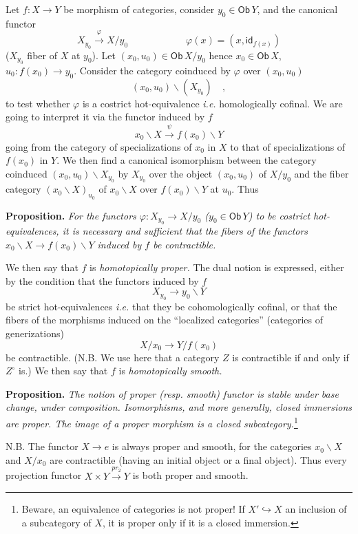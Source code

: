 \documentclass[11pt]{article}
\newcommand{\msp}[1]{\marginpar{\footnotesize [#1]}}
\newcommand{\Ob}{\mathsf{Ob}}
\newcommand{\id}{\mathsf{id}}
\begin{document}
\noindent Let $f : X \to Y$ be morphism of categories, consider $y_0 \in \Ob\, Y$, and the canonical functor
\[
X_{y_0} \xrightarrow{\varphi} X/y_0 \qquad\qquad\qquad \varphi(x) = (x, \id_{f(x)}) \tag*{(1)}
\]
($X_{y_0}$ fiber of $X$ at $y_0$). Let $(x_0, u_0) \in \Ob\, X/y_0$ hence $x_0 \in \Ob\, X$, $u_0 : f(x_0) \to y_0$. Consider the category coinduced by $\varphi$ over $(x_0, u_0)$
\[
(x_0, u_0)\backslash(X_{y_0}) \quad ,
\]
to test whether $\varphi$ is a costrict hot-equivalence \textit{i.e.} homologically cofinal. We are going to interpret it via the functor induced by $f$
\[
x_0\backslash X \xrightarrow{\psi} f(x_0)\backslash Y
\]
going from the category of specializations of $x_0$ in $X$ to that of specializations of $f(x_0)$ in $Y$. We then find a canonical isomorphism between the category coinduced $(x_0, u_0)\backslash X_{y_0}$ by $X_{y_0}$ over the object $(x_0, u_0)$ of $X/y_0$ and the fiber category $(x_0\backslash X)_{u_0}$ of $x_0\backslash X$ over $f(x_0)\backslash Y$ at $u_0$. Thus

\noindent\textbf{Proposition.} \textit{For the functors $\varphi : X_{y_0} \to X/y_0$ ($y_0 \in \Ob\, Y$) to be costrict hot-equivalences, it is necessary and sufficient that the fibers of the functors $x_0\backslash X \to f(x_0)\backslash Y$ induced by $f$ be contractible.}

\noindent\msp{page 54}
We then say that $f$ is \textit{homotopically proper.} The dual notion is expressed, either by the condition that the functors induced by $f$
\[
X_{y_0} \longrightarrow y_0\backslash Y
\]
be strict hot-equivalences \textit{i.e.} that they be cohomologically cofinal, or that the fibers of the morphisms induced on the ``localized categories'' (categories of generizations)
\[
X/x_0 \longrightarrow Y/f(x_0)
\]
be contractible. (N.B. We use here that a category $Z$ is contractible if and only if $Z^\circ$ is.) We then say that $f$ is \textit{homotopically smooth.}

\noindent\textbf{Proposition.} \textit{The notion of proper (resp. smooth) functor is stable under base change, under composition. Isomorphisms, and more generally, closed immersions are proper. The image of a proper morphism is a closed subcategory.}\footnote[23]{Beware, an equivalence of categories is not proper! If $X' \hookrightarrow X$ an inclusion of a subcategory of $X$, it is proper only if it is a closed immersion.}

\noindent N.B. The functor $X \to e$ is always proper and smooth, for the categories $x_0\backslash X$ and $X/x_0$ are contractible (having an initial object or a final object). Thus every projection functor $X \times Y \xrightarrow{pr_2} Y$ is both proper and smooth.
\end{document}
